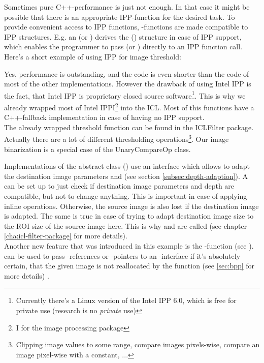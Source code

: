 Sometimes pure C++-performance is just not enough. In that case it might be possible that there is an appropriate IPP-function for the desired task. To provide convenient access to IPP functions, -functions are made compatible to IPP structures. E.g. an  (or ) derives the  () structure in case of IPP support, which enables the programmer to pass  (or ) directly to an IPP function call.\\
Here's a short example of using IPP for image threshold: 


Yes, performance is outstanding, and the code is even shorter than the code of most of the other implementations. However the drawback of using Intel IPP is the fact, that Intel IPP is proprietary closed source software\footnote{Currently there's a Linux version of the Intel IPP 6.0, which is free for private use (research is no \emph{private} use)}. This is why we already wrapped most of Intel IPPI\footnote{I for the image processing package} into the ICL. Most of this functions have a C++-fallback implementation  in case of having no IPP support.\\
The already wrapped threshold function can be found in the ICLFilter  package. Actually there are a lot of different thresholding operations\footnote{Clipping image values to some range, compare images pixels-wise, compare an image pixel-wise with a constant, ...}. Our image binarization is a special case of the UnaryCompareOp  class.

Implementations of the abstract class  () use an  interface which allows to adapt the destination image parameters and  (see section \ref{subsec:depth-adaption}). A  can be set up to just check if destination image parameters and depth are compatible, but not to change anything. This is important in case of applying inline operations. Otherwise, the source image is also lost if the destination image is adapted. The same is true in case of trying to adapt destination image size to the ROI size of the source image here. This is why  and  are called (see chapter \ref{cha:icl-filter-package} for more details).\\
Another new feature that was introduced in this example is the -function (see ).  can be used to pass -references or -pointers to an -interface if it's absolutely certain, that the given image is not reallocated by the function (see \ref{sec:bpp} for more details) .

